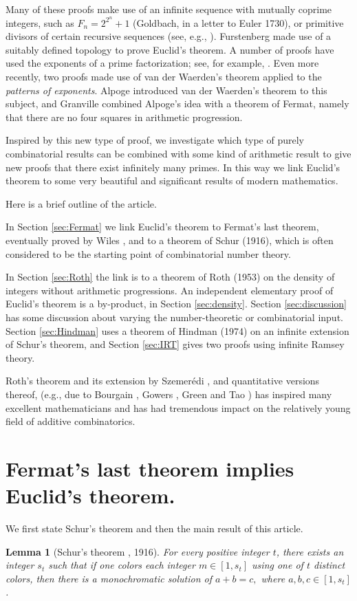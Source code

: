 \documentclass[12pt]{article}
\theoremstyle{theorem}
\newtheorem{lemma}{Lemma}
\theoremstyle{definition}
\begin{document}
Many of these proofs make use of an infinite sequence
with mutually coprime integers, such as $F_n=2^{2^n}+1$ (Goldbach, in a letter to Euler
1730), or primitive divisors of certain recursive sequences 
(see, e.g., \cite{Saidak:2006}).
Furstenberg \cite{Furstenberg} made use of a suitably defined topology to prove
Euclid's theorem.
A number of proofs have used the exponents of a prime factorization;
see, for example,
\cite{Elsholtz:2012, Erdos:1938, Polya:1918}.
Even more recently, two proofs \cite{Alpoge:2015, Granville}
made use of van der Waerden's theorem
applied to the \emph{patterns of exponents}.
Alpoge \cite{Alpoge:2015} introduced van der Waerden's theorem to this subject,
and Granville \cite{Granville} combined Alpoge's idea with
a theorem of Fermat, namely that there are no 
four squares in arithmetic progression.

Inspired by this new type of 
proof, we investigate which type of purely combinatorial results 
can be combined with some kind of arithmetic result to give new proofs that
there exist infinitely many primes. 
In this way we link Euclid's theorem to some very beautiful and significant 
results of modern mathematics.

Here is a brief outline of the article.

In Section {\ref{sec:Fermat}} we link Euclid's theorem
to Fermat's last theorem,  eventually 
proved by Wiles \cite{Wiles:1995}, and to a theorem of Schur (1916),
which is often considered to be 
the starting point of combinatorial number theory.

In Section {\ref{sec:Roth}}
the link is to a theorem of Roth (1953) on the density of integers
without arithmetic progressions.
An independent elementary proof of Euclid's theorem is a by-product, in Section
{\ref{sec:density}}.
Section {\ref{sec:discussion}} has some discussion about varying the
number-theoretic or combinatorial input.
Section {\ref{sec:Hindman}} uses
a theorem of Hindman (1974) on an infinite extension of
Schur's theorem, and Section {\ref{sec:IRT}} gives two proofs using
infinite Ramsey theory.

Roth's theorem and its extension by Szemer\'{e}di
\cite{Szemeredi:1975}, and 
quantitative versions thereof, 
(e.g., due to Bourgain \cite{Bourgain:2008}, Gowers \cite{Gowers:2001}, 
Green and Tao \cite{GreenandTao:2017})
has inspired many excellent mathematicians
 and has had tremendous impact on 
the relatively young field of additive combinatorics.

\section{Fermat's last theorem implies Euclid's theorem.}
{\label{sec:Fermat}}
We first state Schur's theorem and then the main result of this article.
\begin{lemma}[Schur's theorem \cite{Schur}, 1916]
For every positive integer $t$, there exists an integer $s_t$ such that
if one colors each integer $m \in[1,s_t]$ using one of $t$ distinct colors, 
then there is a monochromatic solution of $a+b=c,$ where $a,b,c \in [1,s_t]$.
\end{lemma}
\end{document}
